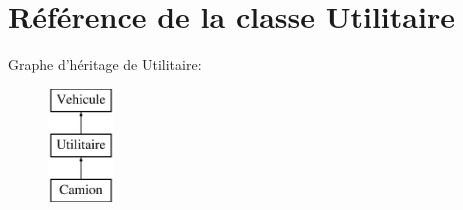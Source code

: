 \hypertarget{class_utilitaire}{
\section{Référence de la classe Utilitaire}
\label{class_utilitaire}
}
Graphe d'héritage de Utilitaire:\begin{figure}[H]
\begin{center}
\leavevmode
\includegraphics[height=3.000000cm]{class_utilitaire}
\end{center}
\end{figure}

